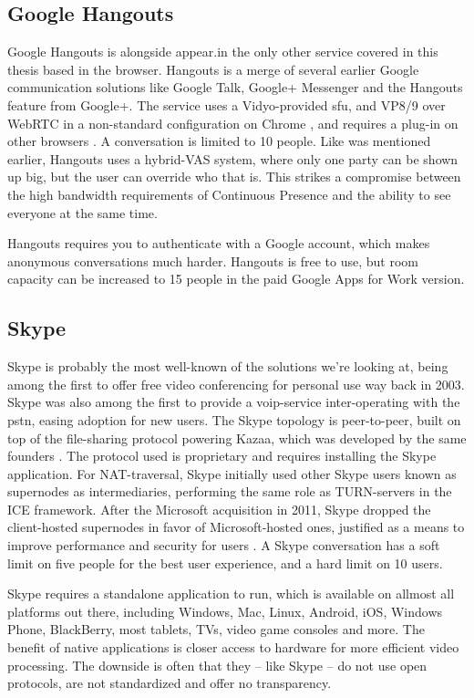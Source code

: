 \subsection{Google Hangouts}

Google Hangouts is alongside appear.in the only other service covered in this thesis based in the browser. Hangouts is a merge of several earlier Google communication solutions like Google Talk, Google+ Messenger and the Hangouts feature from Google+. The service uses a Vidyo-provided \gls{sfu}, and VP8/9 over WebRTC in a non-standard configuration on Chrome \cite{hangouts-webrtc}, and requires a plug-in on other browsers \cite{google-hangouts-support}. A conversation is limited to 10 people. Like was mentioned earlier, Hangouts uses a hybrid-VAS system, where only one party can be shown up big, but the user can override who that is. This strikes a compromise between the high bandwidth requirements of Continuous Presence and the ability to see everyone at the same time.

Hangouts requires you to authenticate with a Google account, which makes anonymous conversations much harder. Hangouts is free to use, but room capacity can be increased to 15 people in the paid Google Apps for Work version.


\subsection{Skype}

Skype is probably the most well-known of the solutions we're looking at, being among the first to offer free video conferencing for personal use way back in 2003. Skype was also among the first to provide a \gls{voip}-service inter-operating with the \gls{pstn}, easing adoption for new users. The Skype topology is peer-to-peer, built on top of the file-sharing protocol powering Kazaa, which was developed by the same founders \cite{skype-history}. The protocol used is proprietary and requires installing the Skype application. For NAT-traversal, Skype initially used other Skype users known as supernodes as intermediaries, performing the same role as TURN-servers in the ICE framework. After the Microsoft acquisition in 2011, Skype dropped the client-hosted supernodes in favor of Microsoft-hosted ones, justified as a means to improve performance and security for users \cite{skype-topo-change}. A Skype conversation has a soft limit on five people for the best user experience, and a hard limit on 10 users.

Skype requires a standalone application to run, which is available on allmost all platforms out there, including Windows, Mac, Linux, Android, iOS, Windows Phone, BlackBerry, most tablets, TVs, video game consoles and more. The benefit of native applications is closer access to hardware for more efficient video processing. The downside is often that they -- like Skype -- do not use open protocols, are not standardized and offer no transparency.


